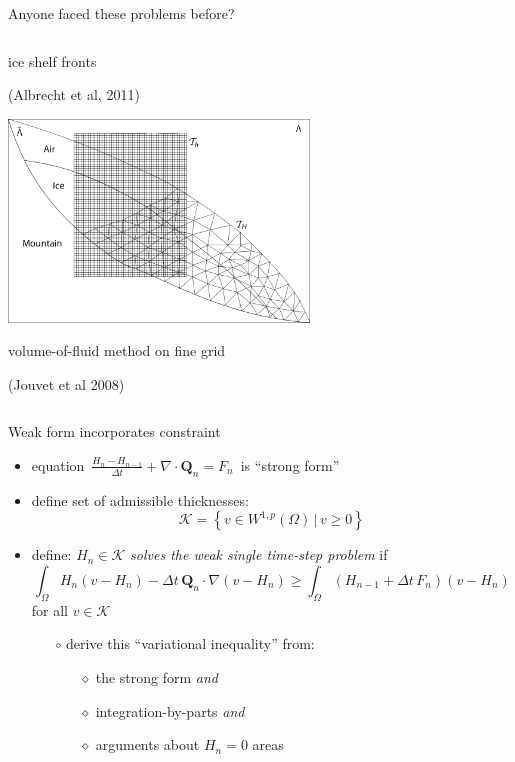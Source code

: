 \documentclass{beamer}
\newcommand\bQ{\mathbf{Q}}
\newcommand{\Div}{\nabla\cdot}
\newcommand{\grad}{\nabla}
\begin{document}
\begin{frame}{Anyone faced these problems before?}
{\begin{columns}
\begin{column}{0.6\textwidth}
\small ice shelf fronts

\tiny (Albrecht et al, 2011)

\small \medskip
\includegraphics[width=0.6\textwidth,keepaspectratio=true]{jouvet-two-grids}

\small volume-of-fluid method on fine grid

\tiny (Jouvet et al 2008)
\end{column}
\end{columns}}

\end{frame}


\begin{frame}{Weak form incorporates constraint}

  \begin{itemize}
  \item equation \,$\frac{H_n - H_{n-1}}{\Delta t} + \Div \bQ_n = F_n$\, is ``strong form''
  \item define set of admissible thicknesses:
    $$\mathcal{K} = \left\{v \in W^{1,p}(\Omega) \,\Big|\, v\ge 0\right\}$$
  \item<2> define: $H_n \in \mathcal{K}$ \emph{solves the weak single time-step problem} if
    $$\int_\Omega H_n (v - H_n) - \Delta t\, \bQ_n \cdot \grad(v - H_n) \ge \int_\Omega \left(H_{n-1} + \Delta t\, F_n\right) (v - H_n)$$
  for all $v \in \mathcal{K}$
  \small
  \medskip
    \begin{itemize}
    \item[$\circ$] derive this ``variational inequality'' from:
      \begin{itemize}
      \item[$\diamond$] the strong form \emph{and}
      \item[$\diamond$] integration-by-parts \emph{and}
      \item[$\diamond$] arguments about $H_n=0$ areas
      \end{itemize}
    \end{itemize}
  \end{itemize}
\end{frame}
\end{document}
